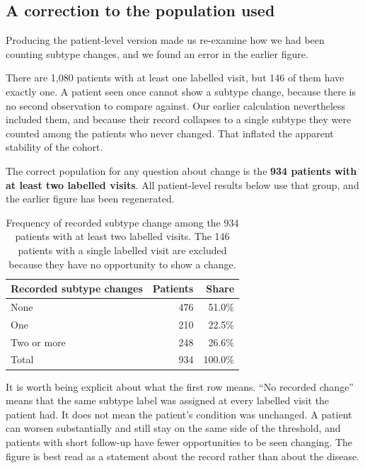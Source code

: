 \documentclass[11pt,a4paper]{article}
\begin{document}
\subsection*{A correction to the population used}

Producing the patient-level version made us re-examine how we had been counting
subtype changes, and we found an error in the earlier figure.

There are 1{,}080 patients with at least one labelled visit, but 146 of them have
exactly one. A patient seen once cannot show a subtype change, because there is
no second observation to compare against. Our earlier calculation nevertheless
included them, and because their record collapses to a single subtype they were
counted among the patients who never changed. That inflated the apparent
stability of the cohort.

The correct population for any question about change is the \textbf{934 patients
with at least two labelled visits}. All patient-level results below use that
group, and the earlier figure has been regenerated.

\begin{table}[H]
\centering
\begin{tabular}{@{}lrr@{}}
\toprule
\textbf{Recorded subtype changes} & \textbf{Patients} & \textbf{Share} \\
\midrule
None                & 476 & \phantom{0}51.0\% \\
One                 & 210 & \phantom{0}22.5\% \\
Two or more         & 248 & \phantom{0}26.6\% \\
\midrule
Total               & 934 & 100.0\% \\
\bottomrule
\end{tabular}
\caption{Frequency of recorded subtype change among the 934 patients with at
least two labelled visits. The 146 patients with a single labelled visit are
excluded because they have no opportunity to show a change.}
\label{tab:change-frequency}
\end{table}

It is worth being explicit about what the first row means. ``No recorded
change'' means that the same subtype label was assigned at every labelled visit
the patient had. It does not mean the patient's condition was unchanged. A
patient can worsen substantially and still stay on the same side of the
threshold, and patients with short follow-up have fewer opportunities to be seen
changing. The figure is best read as a statement about the record rather than
about the disease.
\end{document}
